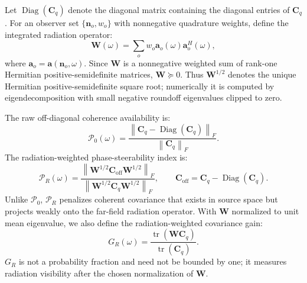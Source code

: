 \documentclass[11pt]{article}
\newcommand{\vect}[1]{\bm{#1}}
\newcommand{\mat}[1]{\bm{#1}}
\begin{document}
Let $\operatorname{Diag}(\mat{C}_q)$ denote the diagonal matrix containing the diagonal entries of $\mat{C}_q$. For an observer set $\{\vect{n}_o,w_o\}$ with nonnegative quadrature weights, define the integrated radiation operator:
\begin{equation}
    \mat{W}(\omega)
    =
    \sum_o
    w_o
    \vect{a}_o(\omega)\vect{a}_o^{H}(\omega),
\label{eq:radiation_operator}
\end{equation}
where $\vect{a}_o=\vect{a}(\vect{n}_o,\omega)$. Since $\mat{W}$ is a nonnegative weighted sum of rank-one Hermitian positive-semidefinite matrices, $\mat{W}\succeq0$. Thus $\mat{W}^{1/2}$ denotes the unique Hermitian positive-semidefinite square root; numerically it is computed by eigendecomposition with small negative roundoff eigenvalues clipped to zero.

The raw off-diagonal coherence availability is:
\begin{equation}
    \mathcal P_0(\omega)
    =
    \frac{
    \left\|
        \mat{C}_q-\operatorname{Diag}(\mat{C}_q)
    \right\|_F
    }{
    \left\|
        \mat{C}_q
    \right\|_F
    }.
\label{eq:p0}
\end{equation}
The radiation-weighted phase-steerability index is:
\begin{equation}
    \mathcal P_R(\omega)
    =
    \frac{
    \left\|
        \mat{W}^{1/2}\mat{C}_{\mathrm{off}}\mat{W}^{1/2}
    \right\|_F
    }{
    \left\|
        \mat{W}^{1/2}\mat{C}_{q}\mat{W}^{1/2}
    \right\|_F
    },
    \qquad
    \mat{C}_{\mathrm{off}}
    =
    \mat{C}_q-\operatorname{Diag}(\mat{C}_q).
\label{eq:pr}
\end{equation}
Unlike $\mathcal P_0$, $\mathcal P_R$ penalizes coherent covariance that exists in source space but projects weakly onto the far-field radiation operator. With $\mat{W}$ normalized to unit mean eigenvalue, we also define the radiation-weighted covariance gain:
\begin{equation}
    G_R(\omega)
    =
    \frac{
        \operatorname{tr}(\mat{W}\mat{C}_q)
    }{
        \operatorname{tr}(\mat{C}_q)
    }.
\label{eq:radiating_gain}
\end{equation}
$G_R$ is not a probability fraction and need not be bounded by one; it measures radiation visibility after the chosen normalization of $\mat{W}$.
\end{document}

